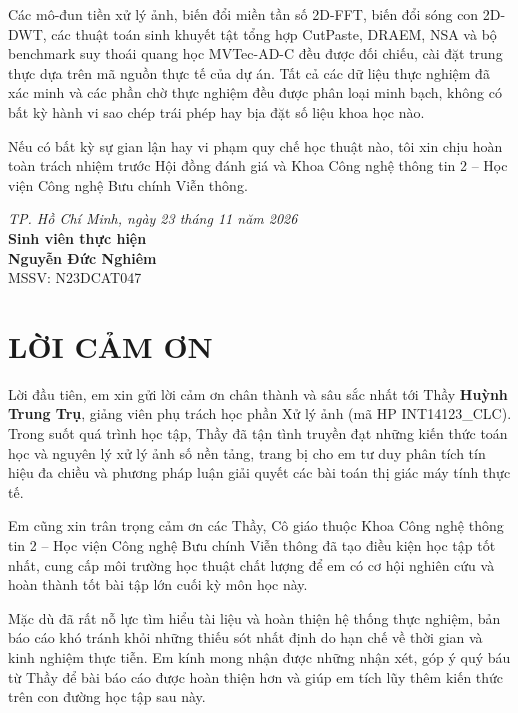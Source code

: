 \documentclass[12pt,a4paper,oneside]{report}
\begin{document}
Các mô-đun tiền xử lý ảnh, biến đổi miền tần số 2D-FFT, biến đổi sóng con 2D-DWT, các thuật toán sinh khuyết tật tổng hợp CutPaste, DRAEM, NSA và bộ benchmark suy thoái quang học MVTec-AD-C đều được đối chiếu, cài đặt trung thực dựa trên mã nguồn thực tế của dự án. Tất cả các dữ liệu thực nghiệm đã xác minh và các phần chờ thực nghiệm đều được phân loại minh bạch, không có bất kỳ hành vi sao chép trái phép hay bịa đặt số liệu khoa học nào.

Nếu có bất kỳ sự gian lận hay vi phạm quy chế học thuật nào, tôi xin chịu hoàn toàn trách nhiệm trước Hội đồng đánh giá và Khoa Công nghệ thông tin 2 -- Học viện Công nghệ Bưu chính Viễn thông.

\vspace{1.5cm}
\begin{flushright}
    \textit{TP. Hồ Chí Minh, ngày 23 tháng 11 năm 2026}\\
    \textbf{Sinh viên thực hiện}\\
    \vspace{2.0cm}
    \textbf{Nguyễn Đức Nghiêm}\\
    MSSV: N23DCAT047
\end{flushright}

\newpage
\chapter*{LỜI CẢM ƠN}

Lời đầu tiên, em xin gửi lời cảm ơn chân thành và sâu sắc nhất tới Thầy \textbf{Huỳnh Trung Trụ}, giảng viên phụ trách học phần Xử lý ảnh (mã HP INT14123\_CLC). Trong suốt quá trình học tập, Thầy đã tận tình truyền đạt những kiến thức toán học và nguyên lý xử lý ảnh số nền tảng, trang bị cho em tư duy phân tích tín hiệu đa chiều và phương pháp luận giải quyết các bài toán thị giác máy tính thực tế.

Em cũng xin trân trọng cảm ơn các Thầy, Cô giáo thuộc Khoa Công nghệ thông tin 2 -- Học viện Công nghệ Bưu chính Viễn thông đã tạo điều kiện học tập tốt nhất, cung cấp môi trường học thuật chất lượng để em có cơ hội nghiên cứu và hoàn thành tốt bài tập lớn cuối kỳ môn học này.

Mặc dù đã rất nỗ lực tìm hiểu tài liệu và hoàn thiện hệ thống thực nghiệm, bản báo cáo khó tránh khỏi những thiếu sót nhất định do hạn chế về thời gian và kinh nghiệm thực tiễn. Em kính mong nhận được những nhận xét, góp ý quý báu từ Thầy để bài báo cáo được hoàn thiện hơn và giúp em tích lũy thêm kiến thức trên con đường học tập sau này.
\end{document}
